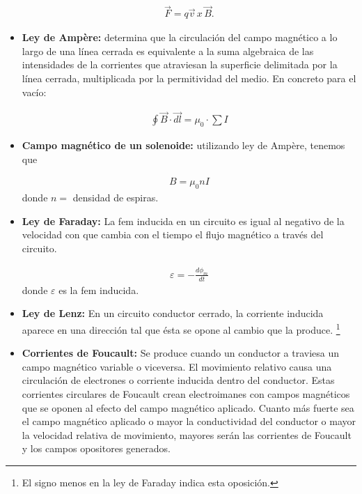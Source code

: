 \documentclass[]{article}
\begin{document}
\begin{multicols*}{2}
\begin{itemize}
    \begin{align}
        \overrightarrow{F} =  q\overrightarrow{v} \, x \, \overrightarrow{B}.
        \label{eq: Lorentz}
    \end{align}
    
    \item \textbf{Ley de Ampère: }\cite{Ley-de-Ampere} determina que la circulación del campo magnético a lo largo de una línea cerrada es equivalente a la suma algebraica de las intensidades 
    de la corrientes que atraviesan la superficie delimitada por la línea cerrada, multiplicada por la permitividad del medio. En concreto para el vacío:
    
    \begin{align}
        \oint \overrightarrow{B} \cdot \overrightarrow{dl} = \mu_{0} \cdot \sum I
        \label{eq: Ampere}
    \end{align}
    
    \item \textbf{Campo magnético de un solenoide:} utilizando ley de Ampère, tenemos que
    
    \begin{align}
        B = \mu_{0}nI
        \label{eq: solenoide}
    \end{align}  
    donde $n = $ densidad de espiras.
    
    
    \item \textbf{Ley de Faraday: }\cite{Ley-de-Faraday} La fem inducida en un circuito es igual al negativo de la velocidad con que cambia con el tiempo el flujo
    magnético a través del circuito.
    
    \begin{align}
        \varepsilon = -\frac{d\phi_{m}}{dt}
        \label{eq: Faraday}
    \end{align}
    donde $\varepsilon$ es la fem inducida.
    
    \item \textbf{Ley de Lenz: }En un circuito conductor cerrado, la corriente inducida aparece en una dirección tal que ésta se opone al
    cambio que la produce. \footnote[1]{El signo menos en la ley de Faraday \cite{Ley-de-Faraday} indica esta oposición.}

    \item \textbf{Corrientes de Foucault: }\cite{Corrientes-de-Foucault} Se produce cuando un conductor a traviesa un campo magnético variable o viceversa. El movimiento relativo causa una circulación de electrones o corriente inducida dentro del conductor. 
    Estas corrientes circulares de Foucault crean electroimanes con campos magnéticos que se oponen al efecto del campo magnético aplicado. Cuanto más fuerte sea el campo magnético aplicado o mayor la conductividad del conductor o mayor la velocidad relativa de movimiento, 
    mayores serán las corrientes de Foucault y los campos opositores generados.
\end{itemize}





\end{multicols*}
\end{document}

